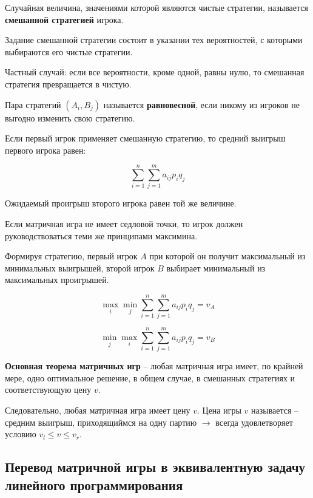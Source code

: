 \documentclass[11pt, a4paper]{article}
\begin{document}
    Случайная величина, значениями которой являются чистые стратегии, называется
    \textbf{смешанной стратегией} игрока.

    Задание смешанной стратегии состоит в указании тех вероятностей, с которыми
    выбираются его чистые стратегии.

    Частный случай: если все вероятности, кроме одной, равны нулю, то смешанная стратегия
    превращается в чистую.

    Пара стратегий $(A_i, B_j)$ называется \textbf{равновесной}, если никому из игроков
    не выгодно изменить свою стратегию.

    Если первый игрок применяет смешанную стратегию, то средний выигрыш первого игрока
    равен:

    \begin{equation}
        \sum_{i=1}^n \sum_{j=1}^m a_{ij} p_i q_j\label{eq:equation}
    \end{equation}

    Ожидаемый проигрыш второго игрока равен той же величине.

    Если матричная игра не имеет седловой точки, то игрок должен руководствоваться теми
    же принципами максимина.

    Формируя стратегию, первый игрок $A$ при которой он получит максимальный из минимальных выигрышей,
    второй игрок $B$ выбирает минимальный из максимальных проигрышей.

    \begin{equation}
        \max_{i} \min_{j} \sum_{i=1}^n \sum_{j=1}^m a_{ij} p_i q_j = v_A\label{eq:equation2}
    \end{equation}

    \begin{equation}
        \min_{j} \max_{i} \sum_{i=1}^n \sum_{j=1}^m a_{ij} p_i q_j = v_B\label{eq:equation3}
    \end{equation}

    \textbf{Основная теорема матричных игр} -- любая матричная игра имеет, по крайней мере,
    одно оптимальное решение, в общем случае, в смешанных стратегиях и соответствующую
    цену $v$.


    Следовательно, любая матричная игра имеет цену $v$.
    Цена игры $v$ называется -- средним выигрыш, приходящиймся на одну партию $\rightarrow$
    всегда удовлетворяет условию $v_l \le v \le v_r$.

    \subsection{Перевод матричной игры в эквивалентную задачу линейного программирования}\label{subsec:to_linear_programming}
\end{document}
